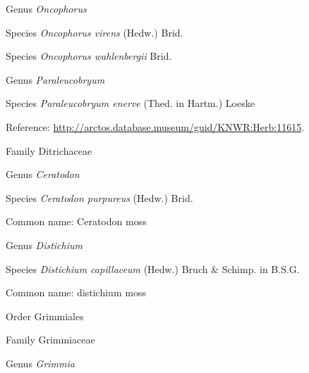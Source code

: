 \documentclass[9pt, article]{memoir}
\begin{document}
\begin{multicols}{2}
\vspace{6pt}\noindent\hspace{30pt}Genus \textit{Oncophorus}


\vspace{6pt}\noindent\hspace{36pt}Species \textit{Oncophorus virens} (Hedw.) Brid.


\vspace{6pt}\noindent\hspace{36pt}Species \textit{Oncophorus wahlenbergii} Brid.


\vspace{6pt}\noindent\hspace{30pt}Genus \textit{Paraleucobryum}


\vspace{6pt}\noindent\hspace{36pt}Species \textit{Paraleucobryum enerve} (Thed. in Hartm.) Loeske


Reference: 
\url{http://arctos.database.museum/guid/KNWR:Herb:11615}.

\vspace{6pt}\noindent\hspace{24pt}Family Ditrichaceae


\vspace{6pt}\noindent\hspace{30pt}Genus \textit{Ceratodon}


\vspace{6pt}\noindent\hspace{36pt}Species \textit{Ceratodon purpureus} (Hedw.) Brid.


Common name: Ceratodon moss

\vspace{6pt}\noindent\hspace{30pt}Genus \textit{Distichium}


\vspace{6pt}\noindent\hspace{36pt}Species \textit{Distichium capillaceum} (Hedw.) Bruch \& Schimp. in B.S.G.


Common name: distichium moss

\vspace{6pt}\noindent\hspace{18pt}Order Grimmiales


\vspace{6pt}\noindent\hspace{24pt}Family Grimmiaceae


\vspace{6pt}\noindent\hspace{30pt}Genus \textit{Grimmia}



\end{multicols}
\end{document}
